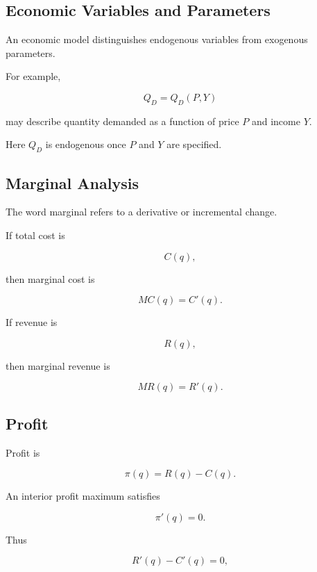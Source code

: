 \subsection{Economic Variables and Parameters}
\label{subsec:economic-variables-parameters}

An economic model distinguishes endogenous variables from exogenous
parameters.

For example,

\[
\boxed{
Q_D
=
Q_D(P,Y)
}
\]

may describe quantity demanded as a function of price \(P\) and income \(Y\).

Here \(Q_D\) is endogenous once \(P\) and \(Y\) are specified.

\subsection{Marginal Analysis}
\label{subsec:marginal-analysis}

The word marginal refers to a derivative or incremental change.

If total cost is

\[
C(q),
\]

then marginal cost is

\[
\boxed{
MC(q)
=
C'(q).
}
\]

If revenue is

\[
R(q),
\]

then marginal revenue is

\[
\boxed{
MR(q)
=
R'(q).
}
\]

\subsection{Profit}
\label{subsec:economic-profit}

Profit is

\[
\boxed{
\pi(q)
=
R(q)-C(q).
}
\]

An interior profit maximum satisfies

\[
\boxed{
\pi'(q)=0.
}
\]

Thus

\[
R'(q)-C'(q)=0,
\]

